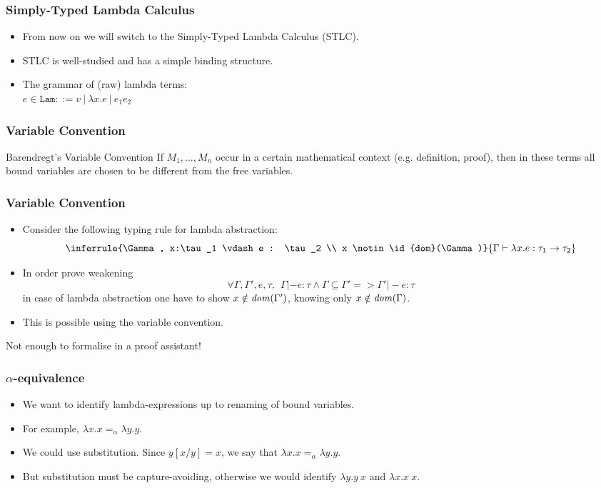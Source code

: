 \documentclass[10pt]{beamer}
\begin{document}
\begin{frame}
  \frametitle{Simply-Typed Lambda Calculus}
  \begin{itemize}
  \item From now on we will switch to the Simply-Typed Lambda Calculus (STLC).
  \item STLC is well-studied and has a simple binding structure.
  \item The grammar of (raw) lambda terms:\\
    $e \in \texttt{Lam}  ::= v ~|~ \lambda x.e ~|~ e_1 e_2$
  \end{itemize}
\end{frame}

\begin{frame}
  \frametitle{Variable Convention}
  \begin{exampleblock}{Barendregt's Variable Convention}
     \large{If $M_1,\dots, M_n$ occur in a certain mathematical context
     (e.g. definition, proof), then in these terms all bound
     variables are chosen to be different from the free variables.}
  \end{exampleblock}
\end{frame}

\begin{frame}
  \frametitle{Variable Convention}
  \begin{itemize}
  \item Consider the following typing rule for lambda abstraction:
    \[ \inferrule{\Gamma, x:\tau_1 \vdash e : \tau_2 \\ x \notin \id{dom}(\Gamma)}
              {\Gamma \vdash \lambda x.e : \tau_1 -> \tau_2} \]
  \item In order prove weakening
    \[\forall \Gamma, \Gamma', e, \tau,~~\Gamma |- e : \tau
    \land \Gamma \subseteq \Gamma' => \Gamma' |- e : \tau\]
  in case of lambda abstraction one have to show
  $x \notin \mathit{dom}(\Gamma')$, knowing only $x \notin \mathit{dom}(\Gamma)$.
\item This is possible using the variable convention.
  \end{itemize}
  \pause
  \centering
  \large{\textcolor{red}{}  Not enough to formalise in a proof assistant!}
\end{frame}

\begin{frame}
  \frametitle{$\alpha$-equivalence}
  \begin{itemize}
  \item We want to identify lambda-expressions up to renaming
    of bound variables.
  \item For example, $\lambda x.x =_\alpha \lambda y.y$.
  \item We could use substitution. Since $y[x/y] = x$, we say that
    $\lambda x.x =_\alpha \lambda y.y$.
  \item But substitution must be capture-avoiding, otherwise we would identify
    $\lambda y.y~x$ and $\lambda x.x~x$.
  \end{itemize}
\end{frame}
\end{document}
